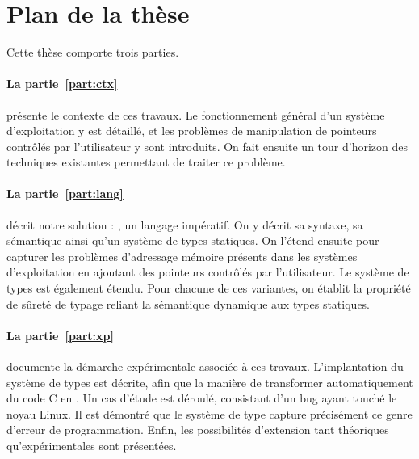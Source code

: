 \section{Plan de la thèse}

Cette thèse comporte trois parties.

\paragraph{La partie~\ref{part:ctx}} présente le contexte de ces travaux. Le
fonctionnement général d'un système d'exploitation y est détaillé, et les
problèmes de manipulation de pointeurs contrôlés par l'utilisateur y sont
introduits. On fait ensuite un tour d'horizon des techniques existantes
permettant de traiter ce problème.


\paragraph{La partie~\ref{part:lang}} décrit notre solution : \langname, un
langage impératif. On y décrit sa syntaxe, sa sémantique ainsi qu'un système de
types statiques. On l'étend ensuite pour capturer les problèmes d'adressage
mémoire présents dans les systèmes d'exploitation en ajoutant des pointeurs
contrôlés par l'utilisateur. Le système de types est également étendu. Pour
chacune de ces variantes, on établit la propriété de sûreté de typage reliant la
sémantique dynamique aux types statiques.


\paragraph{La partie~\ref{part:xp}} documente la démarche expérimentale associée
à ces travaux. L'implantation du système de types est décrite, afin que la
manière de transformer automatiquement du code C en \langname. Un cas d'étude
est déroulé, consistant d'un bug ayant touché le noyau Linux. Il est démontré
que le système de type capture précisément ce genre d'erreur de programmation.
Enfin, les possibilités d'extension tant théoriques qu'expérimentales sont
présentées.




